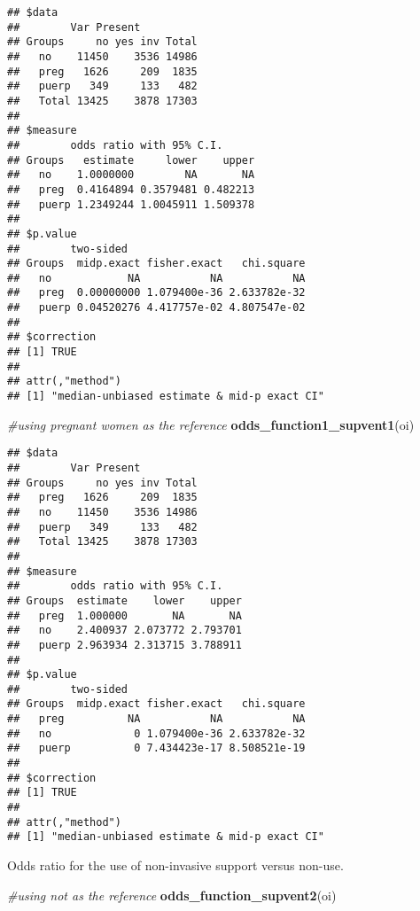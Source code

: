 \documentclass[
]{article}
\newenvironment{Shaded}{\begin{snugshade}}{\end{snugshade}}
\newcommand{\CommentTok}[1]{\textcolor[rgb]{0.56,0.35,0.01}{\textit{#1}}}
\newcommand{\KeywordTok}[1]{\textcolor[rgb]{0.13,0.29,0.53}{\textbf{#1}}}
\newcommand{\NormalTok}[1]{#1}
\begin{document}
\begin{verbatim}
## $data
##        Var Present
## Groups     no yes inv Total
##   no    11450    3536 14986
##   preg   1626     209  1835
##   puerp   349     133   482
##   Total 13425    3878 17303
## 
## $measure
##        odds ratio with 95% C.I.
## Groups   estimate     lower    upper
##   no    1.0000000        NA       NA
##   preg  0.4164894 0.3579481 0.482213
##   puerp 1.2349244 1.0045911 1.509378
## 
## $p.value
##        two-sided
## Groups  midp.exact fisher.exact   chi.square
##   no            NA           NA           NA
##   preg  0.00000000 1.079400e-36 2.633782e-32
##   puerp 0.04520276 4.417757e-02 4.807547e-02
## 
## $correction
## [1] TRUE
## 
## attr(,"method")
## [1] "median-unbiased estimate & mid-p exact CI"
\end{verbatim}

\begin{Shaded}
\begin{Highlighting}[]
\CommentTok{#using pregnant women as the reference}
\KeywordTok{odds_function1_supvent1}\NormalTok{(oi)}
\end{Highlighting}
\end{Shaded}

\begin{verbatim}
## $data
##        Var Present
## Groups     no yes inv Total
##   preg   1626     209  1835
##   no    11450    3536 14986
##   puerp   349     133   482
##   Total 13425    3878 17303
## 
## $measure
##        odds ratio with 95% C.I.
## Groups  estimate    lower    upper
##   preg  1.000000       NA       NA
##   no    2.400937 2.073772 2.793701
##   puerp 2.963934 2.313715 3.788911
## 
## $p.value
##        two-sided
## Groups  midp.exact fisher.exact   chi.square
##   preg          NA           NA           NA
##   no             0 1.079400e-36 2.633782e-32
##   puerp          0 7.434423e-17 8.508521e-19
## 
## $correction
## [1] TRUE
## 
## attr(,"method")
## [1] "median-unbiased estimate & mid-p exact CI"
\end{verbatim}

Odds ratio for the use of non-invasive support versus non-use.

\begin{Shaded}
\begin{Highlighting}[]
\CommentTok{#using not as the reference}
\KeywordTok{odds_function_supvent2}\NormalTok{(oi)}
\end{Highlighting}
\end{Shaded}
\end{document}
